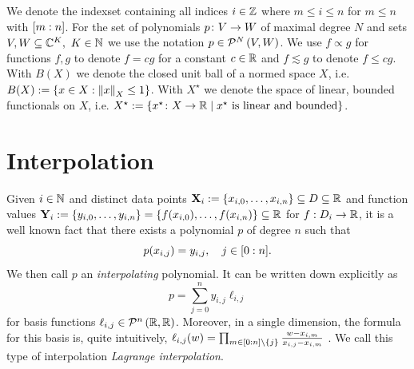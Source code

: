 \documentclass[12pt, oneside]{amsart}
\theoremstyle{definition}
\theoremstyle{remark}
\numberwithin{equation}{section}
\begin{document}

We denote the indexset containing all indices $i\in \Z$ 
where $m\leq i\leq n$ for $m\leq n$ with \(\indexset[m]{n}\). For the set of 
polynomials \(p \from V \to W\) of maximal 
degree \(N\) and sets \(V, W \subseteq \C^K,\ K \in \N\) we use the notation 
\(p \in \pols[N]{V, W}\). 
We use \(f \propto g\) for functions \(f, g\) to denote \(f = 
c g\) for a constant \(c \in \R\) and \(f \lesssim g\) to denote \(f \leq c 
g\). With \(B(X)\) we denote the closed unit ball of a normed space \(X\), 
i.e.\ \(B(X) \defn \set{x \in X: \norm[X]{x} \leq 1}\). With \(X^\star\) we 
denote the space of linear, bounded functionals on \(X\), i.e. \(X^\star \defn 
\set{x^\star\from X \to \R \mid x^\star \text{ is linear and bounded}}\).


\section{Interpolation}

Given \(i \in \N\) and distinct data points \(\XX_i \defn \set{x_{i, 0}, \dots, x_{i, n}} \subseteq D \subseteq \R\) and function values \(\YY_i \defn \set{y_{i, 0}, \dots, y_{i, n}} = \set{f(x_{i, 0}), \dots, f(x_{i, n})} \subseteq \R\) for \(f: D_i \to \R\), it is a well known fact that there exists a polynomial \(p\) of degree \(n\) such that \[
    p(x_{i, j}) = y_{i, j},\quad j \in \indexset[0]{n}.
\]
We then call \(p\) an \emph{interpolating} polynomial. It can be written down explicitly as \begin{equation}\label{interpolating_polynomial}
    p = \sum_{j=0}^n y_{i, j} \ell_{i, j}
\end{equation}
for basis functions \(\ell_{i, j} \in \pols[n]{\R, \R}\). Moreover, in a single dimension, the formula for this basis is, quite intuitively, \(\ell_{i, j}(w) = \prod_{m \in \indexset[0]{n} \setminus \set{j}} \frac{w-x_{i, m}}{x_{i, j}-x_{i, m}}\) \cite{waring1779, lagrange1901}. We call this type of interpolation \emph{Lagrange interpolation}.
\end{document}

